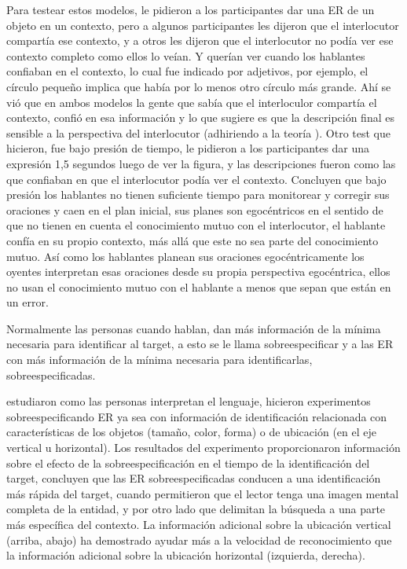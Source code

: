 Para testear estos modelos, le pidieron a los participantes dar una ER de un objeto en un contexto, pero a algunos participantes les dijeron que el interlocutor compart\'ia ese contexto, y a otros les dijeron que el interlocutor no pod\'ia ver ese contexto completo como ellos lo ve\'ian. Y quer\'ian ver cuando los hablantes confiaban en el contexto, lo cual fue indicado por adjetivos, por ejemplo, el c\'irculo peque\~no implica que hab\'ia por lo menos otro c\'irculo m\'as grande. Ah\'i se vi\'o que en ambos modelos la gente que sab\'ia que el interloculor compart\'ia el contexto, confi\'o en esa informaci\'on y lo que sugiere es que la descripci\'on final es sensible a la perspectiva del interlocutor (adhiriendo a la teor\'ia \cite{Clark-Marshall81}). Otro test que hicieron, fue bajo presi\'on de tiempo, le pidieron a los participantes dar una expresi\'on 1,5 segundos luego de ver la figura, y las descripciones fueron como las que confiaban en que el interlocutor pod\'ia ver el contexto. Concluyen que bajo presi\'on los hablantes no tienen suficiente tiempo para monitorear y corregir sus oraciones y caen en el plan inicial, sus planes son egoc\'entricos en el sentido de que no tienen en cuenta el conocimiento mutuo con el interlocutor, el hablante conf\'ia en su propio contexto, m\'as all\'a que este no sea parte del conocimiento mutuo. As\'i como los hablantes planean sus oraciones egoc\'entricamente los oyentes interpretan esas oraciones desde su propia perspectiva egoc\'entrica, ellos no usan el conocimiento mutuo con el hablante a menos que sepan que est\'an en un error.



Normalmente las personas cuando hablan, dan m\'as informaci\'on de la m\'inima necesaria para identificar al target, a esto se le llama sobreespecificar y a las ER con m\'as informaci\'on de la m\'inima necesaria para identificarlas, sobreespecificadas. 

\cite{arts} estudiaron como las personas interpretan el lenguaje, 
hicieron experimentos sobreespecificando ER ya sea con informaci\'on de identificaci\'on relacionada con caracter\'isticas de los objetos (tama\~no, color, forma) o de ubicaci\'on (en el eje vertical u horizontal). Los resultados del experimento
proporcionaron informaci\'on sobre el efecto de la sobreespecificaci\'on en el tiempo de la identificaci\'on del target,
concluyen que las ER sobreespecificadas conducen a una identificaci\'on m\'as r\'apida del target, cuando permitieron que el lector 
tenga una imagen mental completa de la entidad, y por otro lado que delimitan la b\'usqueda a una parte m\'as espec\'ifica
del contexto. La informaci\'on adicional sobre la ubicaci\'on vertical (arriba, abajo) ha demostrado ayudar m\'as a la velocidad de reconocimiento que la informaci\'on adicional sobre la ubicaci\'on horizontal (izquierda, derecha).

